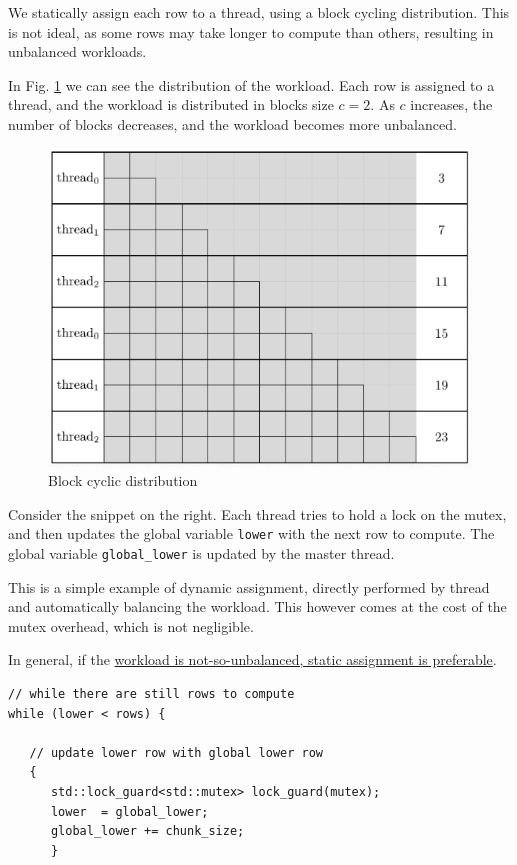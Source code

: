 \begin{paracol}{2}
   We statically assign each row to a thread, using a block cycling distribution.
   This is not ideal, as some rows may take longer to compute than others, resulting in unbalanced workloads.

   In Fig. \ref{fig:08/delta_static} we can see the distribution of the workload. Each row is assigned to a thread, and the workload is distributed in blocks size $c = 2$.
   As $c$ increases, the number of blocks decreases, and the workload becomes more unbalanced.

   \switchcolumn

   \begin{figure}[htbp]
      \centering
      \includegraphics{images/08/delta_static.png}
      \caption{Block cyclic distribution}
      \label{fig:08/delta_static}
   \end{figure}
\end{paracol}

\begin{paracol}{2}
   Consider the snippet on the right. Each thread tries to hold a lock on the mutex, and then updates the global variable \lstinline|lower| with the next row to compute. The global variable \lstinline|global_lower| is updated by the master thread.

   This is a simple example of dynamic assignment, directly performed by thread and automatically balancing the workload. This however comes at the cost of the mutex overhead, which is not negligible.

   In general, if the \ul{workload is not-so-unbalanced, static assignment is preferable}.
   
   \switchcolumn

   \begin{lstlisting}[caption={spm3/all-pairs.cpp}]
// while there are still rows to compute
while (lower < rows) {
   
   // update lower row with global lower row
   {
      std::lock_guard<std::mutex> lock_guard(mutex);
      lower  = global_lower;
      global_lower += chunk_size;
      }
   \end{lstlisting}
         
\end{paracol}


